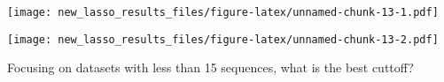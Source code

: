 \documentclass[
]{article}
\newenvironment{Shaded}{\begin{snugshade}}{\end{snugshade}}
\newcommand{\DataTypeTok}[1]{\textcolor[rgb]{0.13,0.29,0.53}{#1}}
\newcommand{\DecValTok}[1]{\textcolor[rgb]{0.00,0.00,0.81}{#1}}
\newcommand{\KeywordTok}[1]{\textcolor[rgb]{0.13,0.29,0.53}{\textbf{#1}}}
\newcommand{\NormalTok}[1]{#1}
\newcommand{\OperatorTok}[1]{\textcolor[rgb]{0.81,0.36,0.00}{\textbf{#1}}}
\newcommand{\StringTok}[1]{\textcolor[rgb]{0.31,0.60,0.02}{#1}}
\begin{document}
\texttt{[image: new\_lasso\_results\_files/figure-latex/unnamed-chunk-13-1.pdf]}

\begin{Shaded}
\end{Shaded}

\texttt{[image: new\_lasso\_results\_files/figure-latex/unnamed-chunk-13-2.pdf]}

Focusing on datasets with less than 15 sequences, what is the best
cuttoff?

\begin{Shaded}
\end{Shaded}
\end{document}
